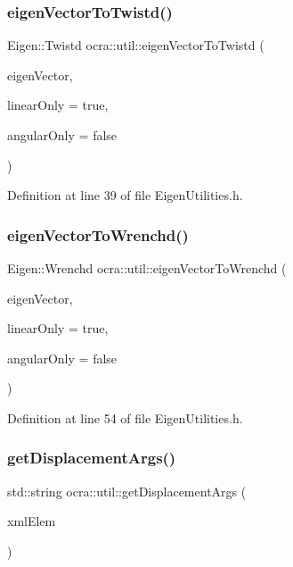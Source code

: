 \subsubsection{\texorpdfstring{eigen\+Vector\+To\+Twistd()}{eigenVectorToTwistd()}}
{\footnotesize\ttfamily Eigen\+::\+Twistd ocra\+::util\+::eigen\+Vector\+To\+Twistd (\begin{DoxyParamCaption}\item[{const Eigen\+::\+Vector\+Xd \&}]{eigen\+Vector,  }\item[{bool}]{linear\+Only = {\ttfamily true},  }\item[{bool}]{angular\+Only = {\ttfamily false} }\end{DoxyParamCaption})\hspace{0.3cm}{\ttfamily [inline]}}



Definition at line 39 of file Eigen\+Utilities.\+h.

\hypertarget{namespaceocra_1_1util_a16659a9542a5680a4704e4b9f8896b24}{}\label{namespaceocra_1_1util_a16659a9542a5680a4704e4b9f8896b24} 
\subsubsection{\texorpdfstring{eigen\+Vector\+To\+Wrenchd()}{eigenVectorToWrenchd()}}
{\footnotesize\ttfamily Eigen\+::\+Wrenchd ocra\+::util\+::eigen\+Vector\+To\+Wrenchd (\begin{DoxyParamCaption}\item[{const Eigen\+::\+Vector\+Xd \&}]{eigen\+Vector,  }\item[{bool}]{linear\+Only = {\ttfamily true},  }\item[{bool}]{angular\+Only = {\ttfamily false} }\end{DoxyParamCaption})\hspace{0.3cm}{\ttfamily [inline]}}



Definition at line 54 of file Eigen\+Utilities.\+h.

\hypertarget{namespaceocra_1_1util_a56277b8b7b0af28ba5eb7d5e952493e2}{}\label{namespaceocra_1_1util_a56277b8b7b0af28ba5eb7d5e952493e2} 
\subsubsection{\texorpdfstring{get\+Displacement\+Args()}{getDisplacementArgs()}}
{\footnotesize\ttfamily std\+::string ocra\+::util\+::get\+Displacement\+Args (\begin{DoxyParamCaption}\item[{Ti\+Xml\+Element $\ast$}]{xml\+Elem }\end{DoxyParamCaption})\hspace{0.3cm}{\ttfamily [inline]}}



